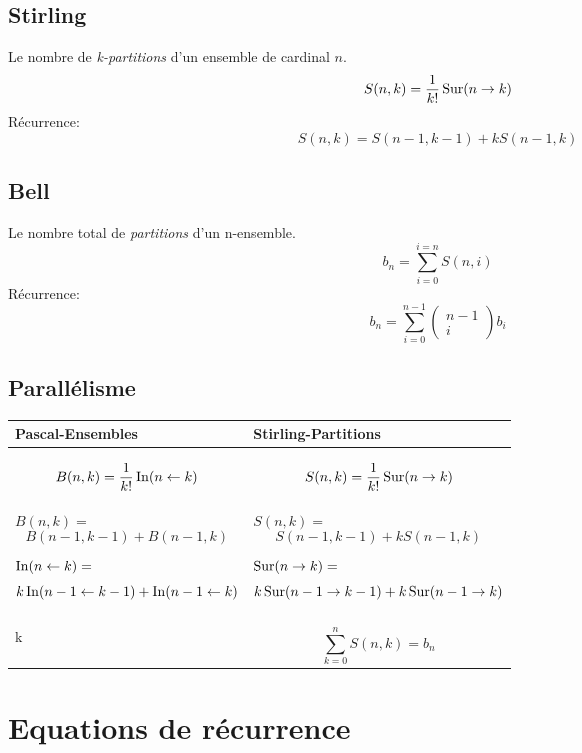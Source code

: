 \subsection{Stirling}
Le nombre de \emph{k-partitions} d'un ensemble de cardinal $n$.
\[S(n, k) = \frac{1}{k!}\operatorname{Sur}( n \rightarrow k)\]
Récurrence:
\[S(n, k) = S(n - 1, k - 1) + kS(n - 1, k)\]

\subsection{Bell}
Le nombre total de \emph{partitions} d'un n-ensemble.
\[b_n = \sum_{i = 0}^{i = n}S(n, i)\]
Récurrence:
\[b_n = \sum_{i = 0}^{n - 1}\begin{pmatrix}  n - 1  \\ i \end{pmatrix}b_i\]

\subsection{Parallélisme}
\begin{center}
\begin{tabular}{p{6cm}|p{6cm}}
\textbf{Pascal-Ensembles}&\textbf{Stirling-Partitions}\\
\hline
&\\
\[B(n,k) = \frac{1}{k!}\operatorname{In}(n \leftarrow k)\] & \[S(n,k) = \frac{1}{k!}\operatorname{Sur}(n \rightarrow k)\]\\
\hline
&\\
$B(n,k) =$\[B(n - 1, k - 1) +  B(n - 1, k)\] & $S(n, k) =$\[S(n - 1, k - 1) + kS(n - 1, k)\]\\
\hline
&\\
$\operatorname{In}(n \leftarrow k)=$\[k\operatorname{In}(n-1 \leftarrow k-1) + \operatorname{In}(n-1 \leftarrow k)\] &
	$\operatorname{Sur}(n \to k) =$\[k\operatorname{Sur}(n-1 \to k-1) + k\operatorname{Sur}(n-1 \to k)\]\\
\hline
&\\
\[\sum_{k = 0}^{n}\begin{pmatrix}  n \\ k \end{pmatrix} = 2^n\]&\[\sum_{k = 0}^{n}S(n,k) = b_n\]\\
\end{tabular}
\end{center}


\section{Equations de récurrence}

